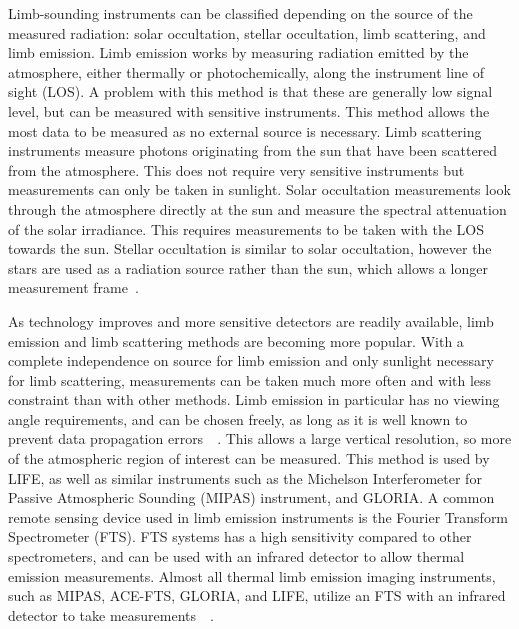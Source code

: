 Limb-sounding instruments can be classified depending on the source of the measured radiation: solar occultation, stellar occultation, limb scattering, and limb emission. Limb emission works by measuring radiation emitted by the atmosphere, either thermally or photochemically, along the instrument line of sight (LOS). A problem with this method is that these are generally low signal level, but can be measured with sensitive instruments. This method allows the most data to be measured as no external source is necessary. Limb scattering instruments measure photons originating from the sun that have been scattered from the atmosphere. This does not require very sensitive instruments but measurements can only be taken in sunlight. Solar occultation measurements look through the atmosphere directly at the sun and measure the spectral attenuation of the solar irradiance. This requires measurements to be taken with the LOS towards the sun. Stellar occultation is similar to solar occultation, however the stars are used as a radiation source rather than the sun, which allows a longer measurement frame~\citep{SPARC}.

As technology improves and more sensitive detectors are readily available, limb emission and limb scattering methods are becoming more popular. With a complete independence on source for limb emission and only sunlight necessary for limb scattering, measurements can be taken much more often and with less constraint than with other methods. Limb emission in particular has no viewing angle requirements, and can be chosen freely, as long as it is well known to prevent data propagation errors~\citep{IR_limb_emission_measurements}~\citep{SPARC}. This allows a large vertical resolution, so more of the atmospheric region of interest can be measured. This method is used by LIFE, as well as similar instruments such as the Michelson Interferometer for Passive Atmospheric Sounding (MIPAS) instrument, and GLORIA. A common remote sensing device used in limb emission instruments is the Fourier Transform Spectrometer (FTS). FTS systems has a high sensitivity compared to other spectrometers, and can be used with an infrared detector to allow thermal emission measurements. Almost all thermal limb emission imaging instruments, such as MIPAS, ACE-FTS, GLORIA, and LIFE, utilize an FTS with an infrared detector to take measurements~\citep{GLORIA_concept}~\citep{MIPAS_instrument}. 

